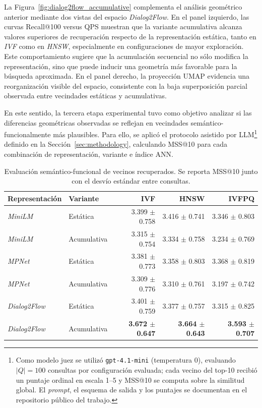 \documentclass[runningheads]{llncs}
\begin{document}
La Figura~\ref{fig:dialog2flow_accumulative} complementa el análisis geométrico anterior mediante dos vistas del espacio \textit{Dialog2Flow}. En el panel izquierdo, las curvas Recall@100 versus QPS muestran que la variante acumulativa alcanza valores superiores de recuperación respecto de la representación estática, tanto en \textit{IVF} como en \textit{HNSW}, especialmente en configuraciones de mayor exploración. Este comportamiento sugiere que la acumulación secuencial no sólo modifica la representación, sino que puede inducir una geometría más favorable para la búsqueda aproximada. En el panel derecho, la proyección UMAP evidencia una reorganización visible del espacio, consistente con la baja superposición parcial observada entre vecindades estáticas y acumulativas.


En este sentido, la tercera etapa experimental tuvo como objetivo analizar si las diferencias geométricas observadas se reflejan en vecindades semántico-funcionalmente más plausibles. Para ello, se aplicó el protocolo asistido por LLM\footnote{Como modelo juez se utilizó \texttt{gpt-4.1-mini} (temperatura $0$), evaluando $|Q|=100$ consultas por configuración evaluada; cada vecino del top-10 recibió un puntaje ordinal en escala 1--5 y MSS@10 se computa sobre la similitud global. El \textit{prompt}, el esquema de salida y los puntajes se documentan en el repositorio público del trabajo.} definido en la Sección~\ref{sec:methodology}, calculando MSS@10 para cada combinación de representación, variante e índice ANN.

\begin{table}[ht]
\centering
\small
\setlength{\tabcolsep}{5pt}
\caption{Evaluación semántico-funcional de vecinos recuperados. Se reporta MSS@10 junto con el desvío estándar entre consultas.}
\label{tab:mss_semantic_eval}
\begin{tabular}{llrrr}
\toprule
Representación & Variante & IVF & HNSW & IVFPQ \\
\midrule
\textit{MiniLM} & Estática & 3.399 $\pm$ 0.758 & 3.416 $\pm$ 0.741 & 3.346 $\pm$ 0.803 \\
\textit{MiniLM} & Acumulativa & 3.315 $\pm$ 0.754 & 3.334 $\pm$ 0.758 & 3.234 $\pm$ 0.769 \\
\midrule
\textit{MPNet} & Estática & 3.381 $\pm$ 0.773 & 3.358 $\pm$ 0.803 & 3.368 $\pm$ 0.819 \\
\textit{MPNet} & Acumulativa & 3.309 $\pm$ 0.776 & 3.310 $\pm$ 0.761 & 3.197 $\pm$ 0.742 \\
\midrule
\textit{Dialog2Flow} & Estática & 3.401 $\pm$ 0.759 & 3.377 $\pm$ 0.757 & 3.315 $\pm$ 0.825 \\
\textit{Dialog2Flow} & Acumulativa & \textbf{3.672 $\pm$ 0.647} & \textbf{3.664 $\pm$ 0.643} & \textbf{3.593 $\pm$ 0.707} \\
\bottomrule
\end{tabular}
\end{table}
\end{document}
